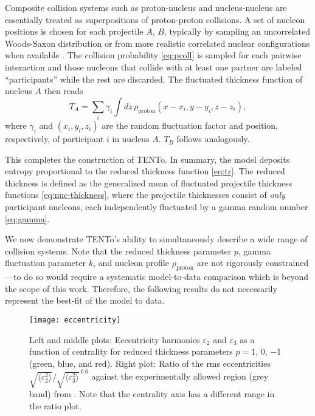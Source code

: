 \documentclass[aps,prc,reprint,amsmath,nofootinbib]{revtex4-1}
\newcommand{\trento}{T\raisebox{-.5ex}{R}ENTo}
\newcommand{\eccratio}{\sqrt{\langle \varepsilon_2^2 \rangle}/\sqrt{\langle \varepsilon_3^2 \rangle}^{\,0.6}}
\begin{document}

Composite collision systems such as proton-nucleus and nucleus-nucleus are essentially treated as
superpositions of proton-proton collisions.
A set of nucleon positions is chosen for each projectile $A$, $B$, typically by sampling an uncorrelated Woods-Saxon distribution or from more realistic correlated nuclear configurations when available \cite{Alvioli:2009ab}.
The collision probability \eqref{eq:pcoll} is sampled for each pairwise interaction and those nucleons that collide with at least one partner are labeled ``participants'' while the rest are discarded.
The fluctuated thickness function of nucleus $A$ then reads
\begin{equation}
  T_A = \sum_i \gamma_i \int dz \, \rho_\text{proton}(x - x_i, y - y_i, z - z_i),
  \label{eq:nuc-thickness}
\end{equation}
where $\gamma_i$ and $(x_i, y_i, z_i)$ are the random fluctuation factor and position, respectively, of participant $i$ in nucleus $A$.
$T_B$ follows analogously.

This completes the construction of \trento.
In summary, the model deposits entropy proportional to the reduced thickness function \eqref{eq:tr}.
The reduced thickness is defined as the generalized mean of fluctuated projectile thickness functions \eqref{eq:nuc-thickness}, where the projectile thicknesses consist of \emph{only} participant nucleons, each independently fluctuated by a gamma random number \eqref{eq:gamma}.


We now demonstrate \trento's ability to simultaneously describe a wide range of collision systems.
Note that the reduced thickness parameter $p$, gamma fluctuation parameter $k$, and nucleon profile $\rho_\text{proton}$ are not rigorously constrained---to do so would require a systematic model-to-data comparison which is beyond the scope of this work.
Therefore, the following results do not necessarily represent the best-fit of the model to data.

\begin{figure*}[t]
  \texttt{[image: eccentricity]}
  \caption{
    \label{fig:eccen}
    Left and middle plots:  Eccentricity harmonics $\varepsilon_2$ and $\varepsilon_3$ as a function of centrality
    for reduced thickness parameters $p = 1$, 0, $-1$ (green, blue, and red).  Right plot:  Ratio of the rms eccentricities
    $\eccratio$ against the experimentally allowed region (grey band) from \cite{Retinskaya:2013gca}.  Note that the centrality
    axis has a different range in the ratio plot.
  }
\end{figure*}
\end{document}
